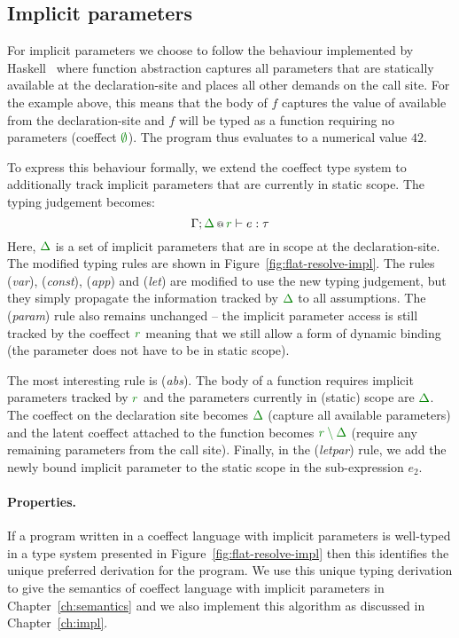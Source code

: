 \subsection{Implicit parameters}
\label{sec:flat-unique-impl}

For implicit parameters we choose to follow the behaviour implemented by Haskell~\cite{app-implicit-parameters}
where function abstraction captures all parameters that are statically available at the declaration-site
and places all other demands on the call site. For the example above, this means
that the body of $f$ captures the value of  available from the declaration-site
and $f$ will be typed as a function requiring no parameters (coeffect $\cclrd{\emptyset}$). The
program thus evaluates to a numerical value $42$.

To express this behaviour formally, we extend the coeffect type system to additionally track
implicit parameters that are currently in static scope. The typing judgement becomes:
%
\begin{equation*}
\coctx{\Gamma;\cclrd{\Delta}}{\cclrd{r}} \vdash e : \tau
\end{equation*}
%
Here, $\cclrd{\Delta}$ is a set of implicit parameters that are in scope at the declaration-site.
The modified typing rules are shown in Figure~\ref{fig:flat-resolve-impl}. The rules (\emph{var}),
(\emph{const}), (\emph{app}) and (\emph{let}) are modified to use the new typing judgement, but they
simply propagate the information tracked by $\cclrd{\Delta}$ to all assumptions. The (\emph{param})
rule also remains unchanged -- the implicit parameter access is still tracked by the coeffect
$\cclrd{r}$ meaning that we still allow a form of dynamic binding (the parameter does not have
to be in static scope).

The most interesting rule is (\emph{abs}). The body of a function requires implicit parameters
tracked by $\cclrd{r}$ and the parameters currently in (static) scope are $\cclrd{\Delta}$.
The coeffect on the declaration site becomes $\cclrd{\Delta}$ (capture all available parameters)
and the latent coeffect attached to the function becomes $\cclrd{r\setminus\Delta}$ (require any
remaining parameters from the call site). Finally, in the (\emph{letpar}) rule, we add the newly
bound implicit parameter  to the static scope in the sub-expression $e_2$.

\paragraph{Properties.}
If a program written in a coeffect language with implicit parameters is well-typed in a type
system presented in Figure~\ref{fig:flat-resolve-impl} then this identifies the unique preferred
derivation for the program. We use this unique typing derivation to give the semantics of coeffect
language with implicit parameters in Chapter~\ref{ch:semantics} and we also implement this algorithm
as discussed in Chapter~\ref{ch:impl}.

